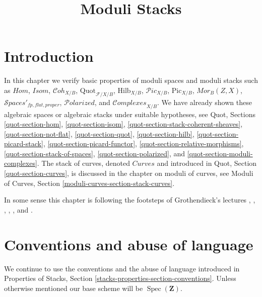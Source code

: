 \documentclass{stacks-project}
\theoremstyle{plain}
\theoremstyle{definition}
\theoremstyle{remark}
\numberwithin{equation}{subsection}
\def\Spec{\mathop{\mathrm{Spec}}}
\def\Cohstack{\mathcal{C}\!\mathit{oh}}
\def\Spacesstack{\mathcal{S}\!\mathit{paces}}
\def\Quotfunctor{\mathrm{Quot}}
\def\Hilbfunctor{\mathrm{Hilb}}
\def\Polarizedstack{\mathcal{P}\!\mathit{olarized}}
\def\Complexesstack{\mathcal{C}\!\mathit{omplexes}}
\def\Picardstack{\mathcal{P}\!\mathit{ic}}
\def\Picardfunctor{\mathrm{Pic}}
\begin{document}
\title{Moduli Stacks}

\maketitle

\label{section-phantom}

\tableofcontents




\section{Introduction}
\label{section-introduction}

\noindent
In this chapter we verify basic properties of moduli spaces
and moduli stacks such as
$\mathit{Hom}$, $\mathit{Isom}$, $\Cohstack_{X/B}$,
$\Quotfunctor_{\mathcal{F}/X/B}$, $\Hilbfunctor_{X/B}$,
$\Picardstack_{X/B}$, $\Picardfunctor_{X/B}$, $\mathit{Mor}_B(Z, X)$,
$\Spacesstack'_{fp, flat, proper}$, $\Polarizedstack$, and
$\Complexesstack_{X/B}$.
We have already shown these algebraic spaces or algebraic stacks
under suitable hypotheses, see Quot, Sections
\ref{quot-section-hom},
\ref{quot-section-isom},
\ref{quot-section-stack-coherent-sheaves},
\ref{quot-section-not-flat},
\ref{quot-section-quot},
\ref{quot-section-hilb},
\ref{quot-section-picard-stack},
\ref{quot-section-picard-functor},
\ref{quot-section-relative-morphisms},
\ref{quot-section-stack-of-spaces},
\ref{quot-section-polarized}, and
\ref{quot-section-moduli-complexes}.
The stack of curves, denoted $\textit{Curves}$ and introduced
in Quot, Section \ref{quot-section-curves}, is discussed in the
chapter on moduli of curves, see
Moduli of Curves, Section \ref{moduli-curves-section-stack-curves}.

\medskip\noindent
In some sense this chapter is following the footsteps of
Grothendieck's lectures \cite{Gr-I},
\cite{Gr-II},
\cite{Gr-III},
\cite{Gr-IV},
\cite{Gr-V}, and
\cite{Gr-VI}.







\section{Conventions and abuse of language}
\label{section-conventions}

\noindent
We continue to use the conventions and the abuse of language
introduced in
Properties of Stacks, Section \ref{stacks-properties-section-conventions}.
Unless otherwise mentioned our base scheme will be $\Spec(\mathbf{Z})$.
\end{document}
